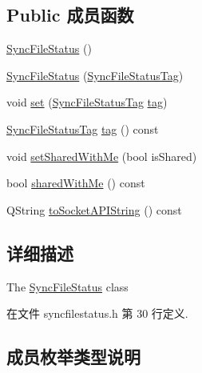 \subsection*{Public 成员函数}
\begin{DoxyCompactItemize}
\item 
\hyperlink{class_o_c_c_1_1_sync_file_status_a1de89c0e9ba424d7d64715b264dd0e97}{Sync\+File\+Status} ()
\item 
\hyperlink{class_o_c_c_1_1_sync_file_status_a7e3ef08d3fdc8fb27854b64d2db9049a}{Sync\+File\+Status} (\hyperlink{class_o_c_c_1_1_sync_file_status_a036555392003d8becbbf4d18d49c358b}{Sync\+File\+Status\+Tag})
\item 
void \hyperlink{class_o_c_c_1_1_sync_file_status_af8d0b2f0986e0a475d64ba3079b7981f}{set} (\hyperlink{class_o_c_c_1_1_sync_file_status_a036555392003d8becbbf4d18d49c358b}{Sync\+File\+Status\+Tag} \hyperlink{class_o_c_c_1_1_sync_file_status_a10fb70f2ec88fa405b94ded421973f9b}{tag})
\item 
\hyperlink{class_o_c_c_1_1_sync_file_status_a036555392003d8becbbf4d18d49c358b}{Sync\+File\+Status\+Tag} \hyperlink{class_o_c_c_1_1_sync_file_status_a10fb70f2ec88fa405b94ded421973f9b}{tag} () const
\item 
void \hyperlink{class_o_c_c_1_1_sync_file_status_a9ad787e82935273672372a9ada9664c7}{set\+Shared\+With\+Me} (bool is\+Shared)
\item 
bool \hyperlink{class_o_c_c_1_1_sync_file_status_a047aaa27240b1723fe02a6a0b6be1ab5}{shared\+With\+Me} () const
\item 
Q\+String \hyperlink{class_o_c_c_1_1_sync_file_status_a8baa0900b9b8082f9aedf651bcbff114}{to\+Socket\+A\+P\+I\+String} () const
\end{DoxyCompactItemize}


\subsection{详细描述}
The \hyperlink{class_o_c_c_1_1_sync_file_status}{Sync\+File\+Status} class 

在文件 syncfilestatus.\+h 第 30 行定义.



\subsection{成员枚举类型说明}
\mbox{\label{class_o_c_c_1_1_sync_file_status_a036555392003d8becbbf4d18d49c358b}} 
